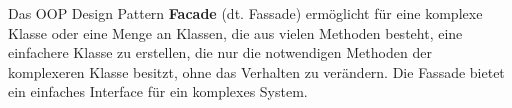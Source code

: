 Das OOP Design Pattern \textbf{Facade} (dt. Fassade) ermöglicht für eine komplexe Klasse oder eine Menge an Klassen, 
die aus vielen Methoden besteht, 
eine einfachere Klasse zu erstellen, 
die nur die notwendigen Methoden der komplexeren Klasse besitzt,
ohne das Verhalten zu verändern. 
Die Fassade bietet ein einfaches Interface für ein komplexes System.